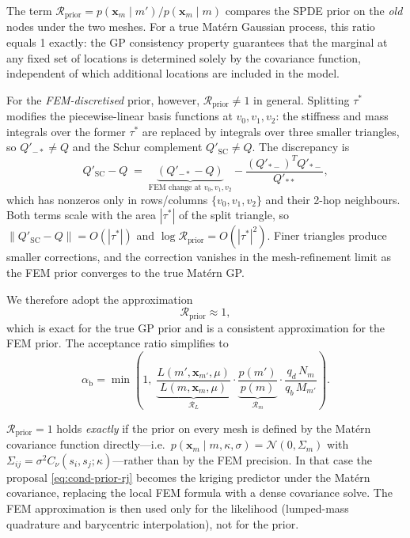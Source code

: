 \documentclass[11pt]{article}
\begin{document}
The term $\mathcal{R}_\mathrm{prior} = p(\mathbf{x}_m\mid m')/p(\mathbf{x}_m\mid m)$
compares the SPDE prior on the \emph{old} nodes under the two meshes.
For a true Mat\'ern Gaussian process, this ratio equals 1 exactly: the GP
consistency property guarantees that the marginal at any fixed set of
locations is determined solely by the covariance function, independent of
which additional locations are included in the model.

For the \emph{FEM-discretised} prior, however, $\mathcal{R}_\mathrm{prior}\neq 1$
in general.  Splitting $\tau^*$ modifies the piecewise-linear basis functions
at $v_0,v_1,v_2$: the stiffness and mass integrals over the former $\tau^*$
are replaced by integrals over three smaller triangles, so $Q'_{-*}\neq Q$ and
the Schur complement $Q'_\mathrm{SC} \neq Q$.  The discrepancy is
\begin{equation}
  Q'_\mathrm{SC} - Q \;=\;
  \underbrace{(Q'_{-*} - Q)}_{\text{FEM change at }v_0,v_1,v_2}
  - \frac{(Q'_{*-})^T Q'_{*-}}{Q'_{**}},
  \label{eq:SC-diff}
\end{equation}
which has nonzeros only in rows/columns $\{v_0,v_1,v_2\}$ and their
2-hop neighbours.  Both terms scale with the area $|\tau^*|$ of the split
triangle, so $\|Q'_\mathrm{SC}-Q\|=O(|\tau^*|)$ and
$\log\mathcal{R}_\mathrm{prior}=O(|\tau^*|^2)$.  Finer triangles produce
smaller corrections, and the correction vanishes in the mesh-refinement limit
as the FEM prior converges to the true Matérn GP.

We therefore adopt the approximation
\begin{equation}
  \mathcal{R}_\mathrm{prior} \approx 1,
  \label{eq:Rprior-approx}
\end{equation}
which is exact for the true GP prior and is a consistent approximation for
the FEM prior.  The acceptance ratio simplifies to
\begin{equation}
  \boxed{
  \alpha_\mathrm{b} = \min\!\left(1,\;
    \underbrace{\frac{L(m',\mathbf{x}_{m'},\mu)}
                     {L(m,\mathbf{x}_m,\mu)}}_{\mathcal{R}_L}
    \cdot
    \underbrace{\frac{p(m')}{p(m)}}_{\mathcal{R}_m}
    \cdot\frac{q_d\,N_m}{q_b\,M_{m'}}
  \right).}
  \label{eq:rj-acc-simple}
\end{equation}

\begin{remark}
$\mathcal{R}_\mathrm{prior}=1$ holds \emph{exactly} if the prior on every mesh
is defined by the Mat\'ern covariance function directly---i.e.\
$p(\mathbf{x}_m\mid m,\kappa,\sigma)=\mathcal{N}(0,\Sigma_m)$ with
$\Sigma_{ij}=\sigma^2 C_\nu(s_i,s_j;\kappa)$---rather than by the FEM
precision.  In that case the proposal \eqref{eq:cond-prior-rj} becomes the
kriging predictor under the Mat\'ern covariance, replacing the local FEM
formula with a dense covariance solve.  The FEM approximation is then used
only for the likelihood (lumped-mass quadrature and barycentric interpolation),
not for the prior.
\end{remark}
\end{document}
